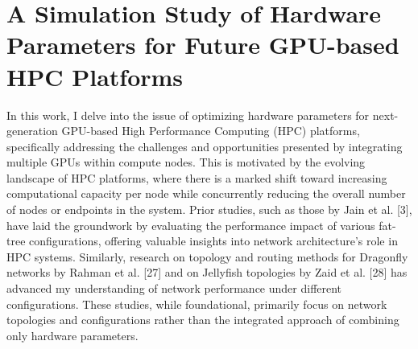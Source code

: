 \chapter{A Simulation Study of Hardware Parameters for Future GPU-based HPC Platforms}

 In this work, I delve into the issue of optimizing hardware parameters for next-generation GPU-based High Performance Computing (HPC) platforms, specifically addressing the challenges and opportunities presented by integrating multiple GPUs within compute nodes. This is motivated by the evolving landscape of HPC platforms, where there is a marked shift toward increasing computational capacity per node while concurrently reducing the overall number of nodes or endpoints in the system.
Prior studies, such as those by Jain et al. [3], have laid the groundwork by evaluating the performance impact of various fat-tree configurations, offering valuable insights into network architecture's role in HPC systems. Similarly, research on topology and routing methods for Dragonfly networks by Rahman et al. [27] and on Jellyfish topologies by Zaid et al. [28] has advanced my understanding of network performance under different configurations. These studies, while foundational, primarily focus on network topologies and configurations rather than the integrated approach of combining only hardware parameters.

